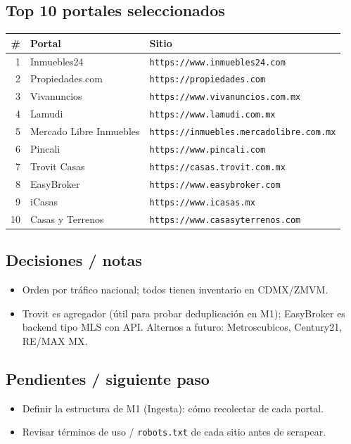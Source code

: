 \documentclass[11pt]{article}
\newcommand{\codigo}[1]{\texttt{#1}}
\newcommand{\pend}{\item[\textcolor{acento}{$\square$}]}
\begin{document}
\subsection*{Top 10 portales seleccionados}
\begin{center}\footnotesize
\begin{tabular}{@{}rll@{}}
\toprule
\# & Portal & Sitio \\
\midrule
1  & Inmuebles24            & \codigo{https://www.inmuebles24.com} \\
2  & Propiedades.com        & \codigo{https://propiedades.com} \\
3  & Vivanuncios            & \codigo{https://www.vivanuncios.com.mx} \\
4  & Lamudi                 & \codigo{https://www.lamudi.com.mx} \\
5  & Mercado Libre Inmuebles& \codigo{https://inmuebles.mercadolibre.com.mx} \\
6  & Pincali                & \codigo{https://www.pincali.com} \\
7  & Trovit Casas           & \codigo{https://casas.trovit.com.mx} \\
8  & EasyBroker             & \codigo{https://www.easybroker.com} \\
9  & iCasas                 & \codigo{https://www.icasas.mx} \\
10 & Casas y Terrenos       & \codigo{https://www.casasyterrenos.com} \\
\bottomrule
\end{tabular}
\end{center}

\subsection*{Decisiones / notas}
\begin{itemize}
  \item Orden por tráfico nacional; todos tienen inventario en CDMX/ZMVM.
  \item Trovit es agregador (útil para probar deduplicación en M1); EasyBroker
        es backend tipo MLS con API. Alternos a futuro: Metroscubicos, Century21,
        RE/MAX MX.
\end{itemize}

\subsection*{Pendientes / siguiente paso}
\begin{itemize}
  \pend Definir la estructura de M1 (Ingesta): cómo recolectar de cada portal.
  \pend Revisar términos de uso / \codigo{robots.txt} de cada sitio antes de scrapear.
\end{itemize}
\end{document}
